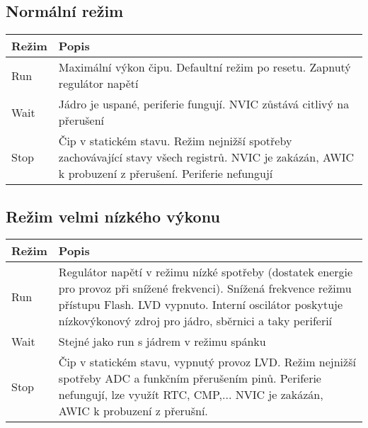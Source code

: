 \documentclass{article}
\begin{document}
\subsection{Normální režim}

\begin{tabularx}{\textwidth}{|>{\centering\arraybackslash}p{}|X|}
    \hline
    \textbf{Režim} & \textbf{Popis} \\
    \hline
    Run & Maximální výkon čipu. Defaultní režim po resetu. Zapnutý regulátor
    napětí \\
    \hline
    Wait & Jádro je uspané, periferie fungují. NVIC zůstává citlivý na
    přerušení \\
    \hline
    Stop & Čip v statickém stavu. Režim nejnižší spotřeby zachovávající stavy
    všech registrů. NVIC je zakázán, AWIC k probuzení z přerušení. Periferie
    nefungují \\
    \hline
\end{tabularx}

\subsection{Režim velmi nízkého výkonu}

\begin{tabularx}{\textwidth}{|>{\centering\arraybackslash}p{}|X|}
    \hline
    \textbf{Režim} & \textbf{Popis} \\
    \hline
    Run & Regulátor napětí v režimu nízké spotřeby (dostatek energie pro
    provoz při snížené frekvenci). Snížená frekvence režimu přístupu Flash.
    LVD vypnuto. Interní oscilátor poskytuje nízkovýkonový zdroj pro jádro,
    sběrnici a taky periferií \\
    \hline
    Wait & Stejné jako run s jádrem v režimu spánku \\
    \hline
    Stop & Čip v statickém stavu, vypnutý provoz LVD. Režim nejnižší spotřeby
    ADC a funkčním přerušením pinů. Periferie nefungují, lze využít RTC,
    CMP,... NVIC je zakázán, AWIC k probuzení z přerušní. \\
    \hline
\end{tabularx}
\end{document}
